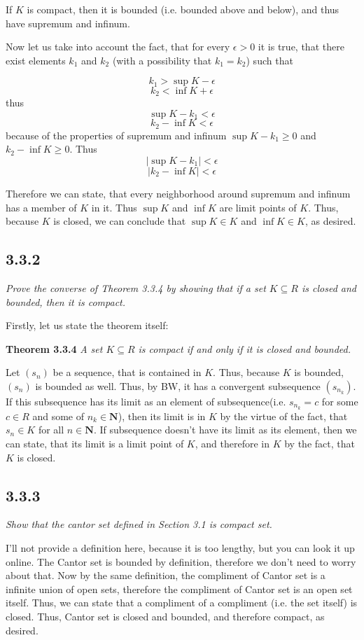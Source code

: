 \documentclass[11pt,oneside,titlepage]{book}
\begin{document}
If $K$ is compact, then it is bounded (i.e. bounded above and below), and
thus have supremum and infinum.

Now let us take into account the fact, that for every $\epsilon > 0$ it is
true, that there exist elements $k_1$ and $k_2$ (with a possibility
that $k_1 = k_2$) such that

$$k_1 > \sup K - \epsilon$$
$$k_2 < \inf K + \epsilon$$
thus
$$\sup K - k_1 <  \epsilon$$
$$k_2 - \inf K < \epsilon$$
because of the properties of supremum and infinum $\sup K - k_1 \geq  0$ and
$k_2 - \inf K \geq 0$. Thus
$$|\sup K - k_1| < \epsilon$$
$$|k_2 - \inf K| < \epsilon$$

Therefore we can state, that every neighborhood around supremum and infinum
has a member of $K$ in it. Thus $\sup K$ and $\inf  K$ are limit points of $K$.
Thus, because $K$ is closed, we can conclude that $\sup K \in K$ and
$\inf K \in K$, as desired.

\subsection*{3.3.2}
\textit{Prove the converse of Theorem 3.3.4 by showing that if a set
  $K \subseteq R$ is closed and bounded, then it is compact.}

Firstly, let us state the theorem itself:

\textbf{Theorem 3.3.4}
\textit{A set $K \subseteq R$ is compact if and only if it is closed and
  bounded.}

Let $(s_n)$ be a sequence, that is contained in $K$. Thus, because $K$ is
bounded, $(s_n)$ is bounded as well. Thus, by BW, it has a convergent
subsequence $(s_{n_k})$. If this subsequence has its limit as an
element of subsequence(i.e. $s_{n_k} = c$
for some $c \in R$ and some of $n_k \in  \textbf{N}$),
then its limit is in $K$ by the virtue of the fact, that $s_n \in K$ for
all $n \in \textbf{N}$.
If subsequence doesn't have its limit as its element, then we can state,
that its limit is a limit point of $K$, and therefore in $K$ by the fact, that
$K$ is closed.

\subsection*{3.3.3}
\textit{Show that the cantor set defined in Section 3.1 is compact set. }

I'll not provide a definition here, because it is too lengthy, but you can
look it up online. The Cantor set is bounded by definition, therefore we don't
need to worry about that. Now by the same definition, 
the compliment of Cantor set is a infinite union of open sets, therefore
the compliment of Cantor set is an open set itself. Thus, we can state
that a compliment of a compliment (i.e. the set itself) is closed. Thus,
Cantor set is closed and bounded, and therefore compact, as desired.
\end{document}
